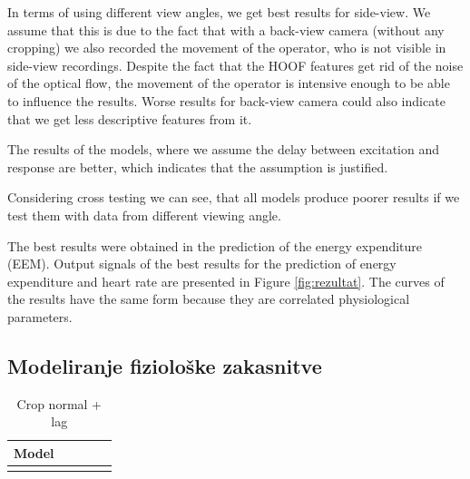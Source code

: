 In terms of using different view angles, we get best results for side-view. We assume that this is due to the fact that with a back-view camera (without any cropping) we also recorded the movement of the operator, who is not visible in side-view recordings. Despite the fact that the HOOF features get rid of the noise of the optical flow, the movement of the operator is intensive enough to be able to influence the results. Worse results for back-view camera could also indicate that we get less descriptive features from it. 

The results of the models, where we assume the delay between excitation and response are better, which indicates that the assumption is justified.

Considering cross testing we can see, that all models produce poorer results if we test them with data from different viewing angle.

The best results were obtained in the prediction of the energy expenditure (EEM). Output signals of the best results for the prediction of energy expenditure and heart rate are presented in Figure \ref{fig:rezultat}. The curves of the results have the same form because they are correlated physiological parameters.







\subsection{Modeliranje fiziološke zakasnitve}
\begin{table}[!htbp]
	\centering
	\begin{tabular}{l S[table-format=1.2, round-mode=places, round-precision=2] S[table-format=1.2, round-mode=places, round-precision=2] S[table-format=1.2, round-mode=places, round-precision=2] S[table-format=1.2, round-mode=places, round-precision=2]}
		\toprule
		\textbf{Model} &  &  &  &  \\
		\midrule
		\bottomrule
	\end{tabular}
	\caption{Crop normal + lag}
	\label{tab:lag}
\end{table}



